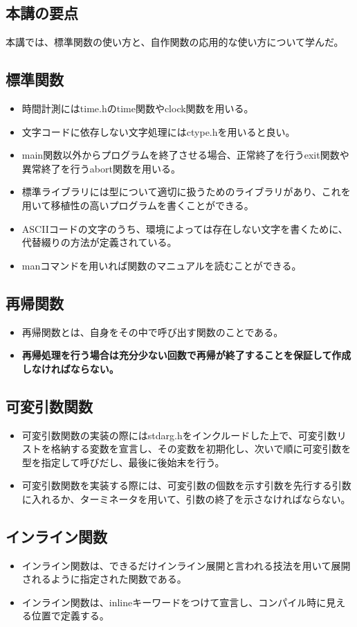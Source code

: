 \begin{shadebox}
\section*{本講の要点}
本講では、標準関数の使い方と、自作関数の応用的な使い方について学んだ。
\subsection*{標準関数}
\begin{itemize}
\item 時間計測にはtime.hのtime関数やclock関数を用いる。
\item 文字コードに依存しない文字処理にはctype.hを用いると良い。
\item main関数以外からプログラムを終了させる場合、正常終了を行うexit関数や異常終了を行うabort関数を用いる。
\item 標準ライブラリには型について適切に扱うためのライブラリがあり、これを用いて移植性の高いプログラムを書くことができる。
\item ASCIIコードの文字のうち、環境によっては存在しない文字を書くために、代替綴りの方法が定義されている。
\item manコマンドを用いれば関数のマニュアルを読むことができる。
\end{itemize}
\subsection*{再帰関数}
\begin{itemize}
\item 再帰関数とは、自身をその中で呼び出す関数のことである。
\item \textbf{再帰処理を行う場合は充分少ない回数で再帰が終了することを保証して作成しなければならない。}
\end{itemize}
\subsection*{可変引数関数}
\begin{itemize}
\item 可変引数関数の実装の際にはstdarg.hをインクルードした上で、可変引数リストを格納する変数を宣言し、その変数を初期化し、次いで順に可変引数を型を指定して呼びだし、最後に後始末を行う。
\item 可変引数関数を実装する際には、可変引数の個数を示す引数を先行する引数に入れるか、ターミネータを用いて、引数の終了を示さなければならない。
\end{itemize}
\subsection*{インライン関数}
\begin{itemize}
\item インライン関数は、できるだけインライン展開と言われる技法を用いて展開されるように指定された関数である。
\item インライン関数は、inlineキーワードをつけて宣言し、コンパイル時に見える位置で定義する。
\end{itemize}
\end{shadebox}
